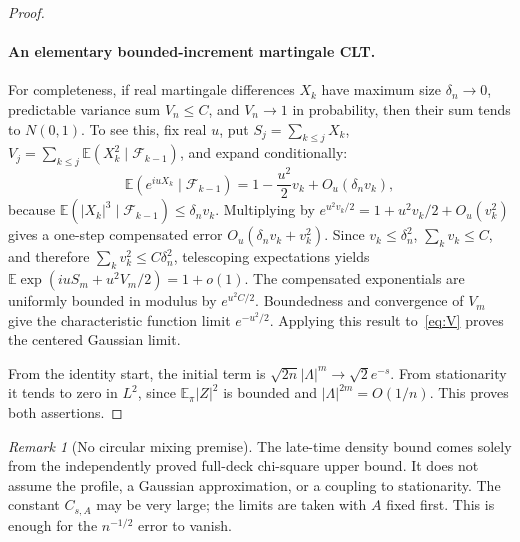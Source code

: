\documentclass[11pt]{article}
\theoremstyle{remark}
\newtheorem{remark}[theorem]{Remark}
\newcommand{\E}{\mathbb E}
\begin{document}
\begin{proof}
\paragraph{An elementary bounded-increment martingale CLT.}
For completeness, if real martingale differences $X_k$ have maximum size $\delta_n\to0$, predictable variance sum $V_n\leq C$, and $V_n\to1$ in probability, then their sum tends to $N(0,1)$. To see this, fix real $u$, put $S_j=\sum_{k\leq j}X_k$, $V_j=\sum_{k\leq j}\E(X_k^2\mid\mathcal F_{k-1})$, and expand conditionally:
\[
 \E(e^{iuX_k}\mid\mathcal F_{k-1})
 =1-\frac{u^2}2 v_k+O_u(\delta_n v_k),
\]
because $\E(|X_k|^3\mid\mathcal F_{k-1})\leq\delta_n v_k$. Multiplying by $e^{u^2v_k/2}=1+u^2v_k/2+O_u(v_k^2)$ gives a one-step compensated error $O_u(\delta_n v_k+v_k^2)$. Since $v_k\leq\delta_n^2$, $\sum_k v_k\leq C$, and therefore $\sum_kv_k^2\leq C\delta_n^2$, telescoping expectations yields
$\E\exp(iuS_m+u^2V_m/2)=1+o(1)$. The compensated exponentials are uniformly bounded in modulus by $e^{u^2C/2}$. Boundedness and convergence of $V_m$ give the characteristic function limit $e^{-u^2/2}$.
Applying this result to~\eqref{eq:V} proves the centered Gaussian limit.

From the identity start, the initial term is
$\sqrt{2n}|\Lambda|^m\to\sqrt2e^{-s}$. From stationarity it tends to zero in $L^2$, since $\E_\pi|Z|^2$ is bounded and $|\Lambda|^{2m}=O(1/n)$. This proves both assertions.
\end{proof}

\begin{remark}[No circular mixing premise]
The late-time density bound comes solely from the independently proved full-deck chi-square upper bound. It does not assume the profile, a Gaussian approximation, or a coupling to stationarity. The constant $C_{s,A}$ may be very large; the limits are taken with $A$ fixed first. This is enough for the $n^{-1/2}$ error to vanish.
\end{remark}
\end{document}
